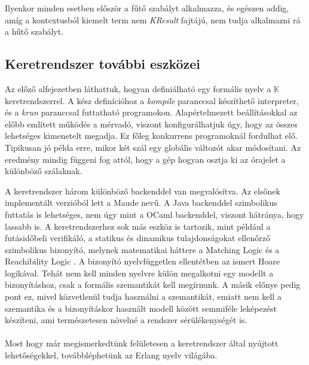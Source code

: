 

Ilyenkor minden esetben először a fűtő szabályt alkalmazza, és egészen addig, amíg a kontextusból kiemelt term nem \textit{KResult} fajtájú, nem tudja alkalmazni rá a hűtő szabályt.

\subsection{Keretrendszer további eszközei}

Az előző alfejezetben láthattuk, hogyan definiálható egy formális nyelv a $\mathbb{K}$ keretrendszerrel. A kész definícióhoz a \textit{kompile} paranccsal készíthető interpreter, és a \textit{krun} paranccsal futtatható programokon. Alapértelmezett beállításokkal az előbb említett működés a mérvadó, viszont konfigurálhatjuk úgy, hogy az összes lehetséges kimenetelt megadja. Ez főleg konkurrens programoknál fordulhat elő. Tipikusan jó példa erre, mikor két szál egy globális változót akar módosítani. Az eredmény mindig függeni fog attól, hogy a gép hogyan osztja ki az órajelet a különböző szálaknak.

A keretrendszer három különböző backenddel van megvalósítva. Az elsőnek implementált verzióból lett a Maude nevű. A Java backenddel szimbolikus futtatás is lehetséges, nem úgy mint a OCaml backenddel, viszont hátránya, hogy lassabb is. A keretrendszerhez sok más eszköz is tartozik, mint például a futásidőbeli verifikáló, a statikus és dinamikus tulajdonságokat ellenőrző szimbolikus bizonyító, melynek matematikai háttere a Matching Logic \cite{MatchLog} és a Reachibility Logic \cite{ReachLog}. A bizonyító nyelvfüggetlen ellentétben az ismert Hoare logikával. Tehát nem kell minden nyelvre külön megalkotni egy modellt a bizonyításhoz, csak a formális szemantikát kell megírnunk. A másik előnye pedig pont ez, mivel közvetlenül tudja használni a szemantikát, emiatt nem kell a szemantika és a bizonyításkor használt modell között semmiféle leképezést készíteni, ami természetesen növelné a rendszer sérülékenységét is.

\paragraph{}
Most hogy már megismerkedtünk felületesen a keretrendszer által nyújtott lehetőségekkel, továbbléphetünk az Erlang nyelv világába.


